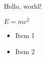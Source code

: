 \documentclass{article}
\begin{document}
Hello, world!

$E=mc^2$

\begin{itemize}
    \item Item 1
    \item Item 2
\end{itemize}
\end{document}
